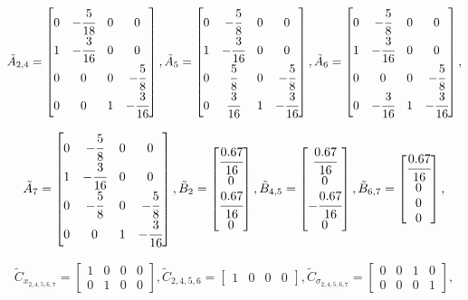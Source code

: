 \begin{align*}
\tilde{A}_{2,4}=
\begin{bmatrix}
0&-\cfrac{5}{18}&0&0\\
1&-\cfrac{3}{16}&0&0\\
0&0&0&-\cfrac{5}{8}\\
0 &0&1&-\cfrac{3}{16}
\end{bmatrix},
\tilde{A}_5=
\begin{bmatrix}
0&-\cfrac{5}{8}&0&0\\
1&-\cfrac{3}{16}&0&0\\
0&\cfrac{5}{8}&0&-\cfrac{5}{8}\\
0&\cfrac{3}{16}&1&-\cfrac{3}{16}
\end{bmatrix},
\tilde{A}_6=
\begin{bmatrix}
0&-\cfrac{5}{8}&0&0\\
1&-\cfrac{3}{16}&0&0\\
0&0&0&-\cfrac{5}{8}\\
0&-\cfrac{3}{16}&1&-\cfrac{3}{16}
\end{bmatrix},
\end{align*}

\begin{align*}
\tilde{A}_7=
\begin{bmatrix}
0&-\cfrac{5}{8}&0&0\\
1&-\cfrac{3}{16}&0&0\\
0&-\cfrac{5}{8}&0&-\cfrac{5}{8}\\
0&0&1&-\cfrac{3}{16}
\end{bmatrix},
\tilde{B}_2=
\begin{bmatrix}
\cfrac{0.67}{16}\\
0\\
\cfrac{0.67}{16}\\
0
\end{bmatrix},
\tilde{B}_{4,5}=
\begin{bmatrix}
\cfrac{0.67}{16}\\0\\
-\cfrac{0.67}{16}\\
0
\end{bmatrix},
\tilde{B}_{6,7}=
\begin{bmatrix}
\cfrac{0.67}{16}\\
0\\
0\\
0
\end{bmatrix},
\end{align*}

\begin{align*}
\tilde{C}_x_{2,4,5,6,7}=
\begin{bmatrix}
1&0&0&0\\0&1&0&0
\end{bmatrix},
\tilde{C}_{2,4,5,6}=
\begin{bmatrix}
1&0&0&0
\end{bmatrix},
\tilde{C}_{\sigma_{2,4,5,6,7}}=
\begin{bmatrix}
0&0&1&0\\0&0&0&1
\end{bmatrix},
\end{align*}

